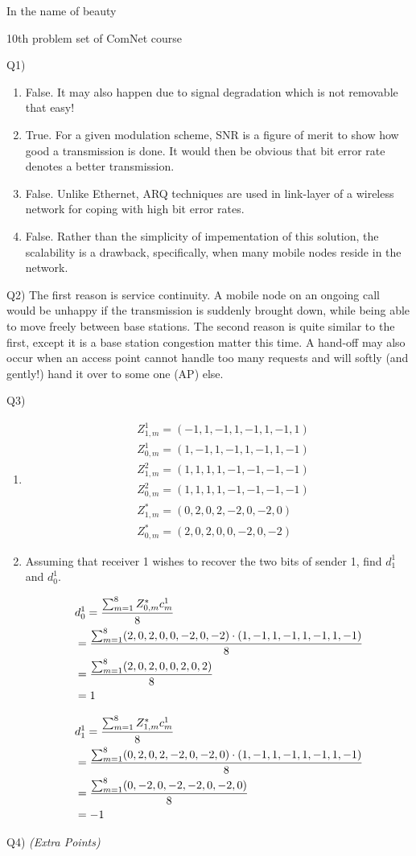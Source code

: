 \documentclass[10pt,letterpaper]{article}
\newcommand{\qn}[1]{
\begin{equation}
\begin{split}
#1
\end{split}
\end{equation}
}
\begin{document}
\Large
\begin{center}
In the name of beauty

10th problem set of ComNet course

\hrulefill
\end{center}
Q1)
\begin{enumerate}[label=\alph*-]
\item
False. It may also happen due to signal degradation which is not removable that easy!
\item
True. For a given modulation scheme, SNR is a figure of merit to show how good a transmission is done. It would then be obvious that bit error rate denotes a better transmission.
\item
False. {\color{blue}Un}like Ethernet, ARQ techniques are used in link-layer of a wireless network for coping with high bit error rates.
\item
False. Rather than the simplicity of impementation of this solution, the scalability is a drawback, specifically, when many mobile nodes reside in the network.
\end{enumerate}

Q2) The first reason is service continuity. A mobile node on an ongoing call would be unhappy if the transmission is suddenly brought down, while being able to move freely between base stations. The second reason is quite similar to the first, except it is a base station congestion matter this time. A hand-off may also occur when an access point cannot handle too many requests and will softly (and gently!) hand it over to some one (AP) else.

Q3)
\begin{enumerate}[label=\alph*-]
\item
\qn{
&Z_{1,m}^1=(-1,1,-1,1,-1,1,-1,1)
\\&Z_{0,m}^1=(1,-1,1,-1,1,-1,1,-1)
\\&Z_{1,m}^2=(1,1,1,1,-1,-1,-1,-1)
\\&Z_{0,m}^2=(1,1,1,1,-1,-1,-1,-1)
\\&Z_{1,m}^*=(0,2,0,2,-2,0,-2,0)
\\&Z_{0,m}^*=(2,0,2,0,0,-2,0,-2)
}
\item
Assuming that receiver 1 wishes to recover the two bits of sender 1, find $d_1^1$ and $d_0^1$.
\qn{
&d_0^1={\sum_{m=1}^8Z^*_{0,m}c_m^1\over 8}
\\&={\sum_{m=1}^8(2,0,2,0,0,-2,0,-2)\cdot(1,-1,1,-1,1,-1,1,-1)\over 8}
\\&={\sum_{m=1}^8(2,0,2,0,0,2,0,2)\over 8}
\\&=1
}
\qn{
&d_1^1={\sum_{m=1}^8Z^*_{1,m}c_m^1\over 8}
\\&={\sum_{m=1}^8(0,2,0,2,-2,0,-2,0)\cdot(1,-1,1,-1,1,-1,1,-1)\over 8}
\\&={\sum_{m=1}^8(0,-2,0,-2,-2,0,-2,0)\over 8}
\\&=-1
}
\end{enumerate}
Q4) \textit{(Extra Points)}
\end{document}
